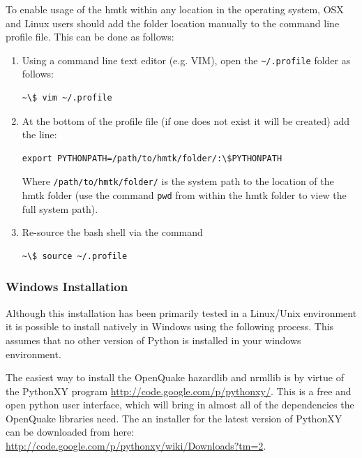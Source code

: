 To enable usage of the hmtk within any location in the operating system, OSX and Linux users should add the folder location manually to the command line profile file. This can be done as follows:

\begin{enumerate}
\item Using a command line text editor (e.g. VIM), open the \verb=~/.profile= folder as follows:

\begin{Verbatim}[frame=single, commandchars=\\\{\}, fontsize=\scriptsize]
~\$ vim ~/.profile
\end{Verbatim}

\item At the bottom of the profile file (if one does not exist it will be created) add the line:

\begin{Verbatim}[frame=single, commandchars=\\\{\}, fontsize=\scriptsize]
export PYTHONPATH=/path/to/hmtk/folder/:\$PYTHONPATH
\end{Verbatim}

Where \verb=/path/to/hmtk/folder/= is the system path to the location of the hmtk folder (use the command \verb=pwd= from within the hmtk folder to view the full system path).

\item Re-source the bash shell via the command

\begin{Verbatim}[frame=single, commandchars=\\\{\}, fontsize=\scriptsize]
~\$ source ~/.profile
\end{Verbatim}
 
\end{enumerate}

\subsubsection{Windows Installation}

Although this installation has been primarily tested in a Linux/Unix environment it is possible to install natively in Windows using the following process. This assumes that no other version of Python is installed in your windows environment.

The easiest way to install the OpenQuake hazardlib and nrmllib is by virtue of the PythonXY program \href{http://code.google.com/p/pythonxy/}{http://code.google.com/p/pythonxy/}. This is a free and open python user interface, which will bring in almost all of the dependencies the OpenQuake libraries need. The an installer for the latest version of PythonXY can be downloaded from here: \\ \href{http://code.google.com/p/pythonxy/wiki/Downloads?tm=2}{http://code.google.com/p/pythonxy/wiki/Downloads?tm=2}.

